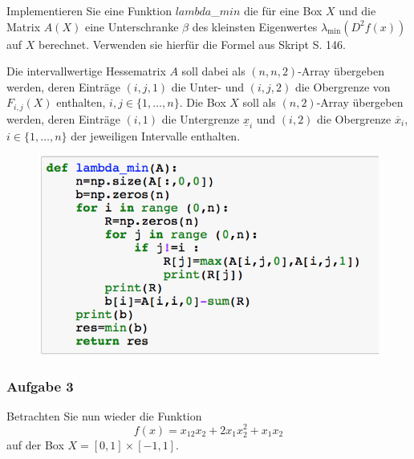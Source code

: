 \documentclass[12pt]{extreport} %
\begin{document}
Implementieren Sie eine Funktion $lambda$_$min$ die für eine Box $X$ und die Matrix $A(X)$ eine Unterschranke $\beta$ des kleinsten Eigenwertes $\lambda_{\min}(D^2f(x))$ auf $X$ berechnet. Verwenden sie hierfür die Formel aus Skript S. 146. ~\smallskip

Die intervallwertige Hessematrix $A$ soll dabei als $(n,n,2)$-Array übergeben werden, deren Einträge $(i,j,1)$ die Unter- und $(i,j,2)$ die Obergrenze von $F_{i,j}(X)$ enthalten, $i,j \in \{1, \dotsc, n\}$. Die Box $X$ soll als $(n, 2)$-Array übergeben werden, deren Einträge $(i, 1)$ die Untergrenze $\underline{x}_i$ und $(i, 2)$ die Obergrenze $\overline{x}_i$, $i \in \{1, \dotsc, n \}$ der jeweiligen Intervalle enthalten.

			\begin{figure}[h!] \centering
				\includegraphics[scale=.75]{img/su2iv-ii}
			\end{figure}
\newpage

\subsubsection*{Aufgabe 3}

Betrachten Sie nun wieder die Funktion
	$$ f(x) = x_12 x_2 + 2x_1 x_2^2 + x_1 x_2 $$
auf der Box $X = [0, 1] \times [-1, 1]$.
\end{document}
